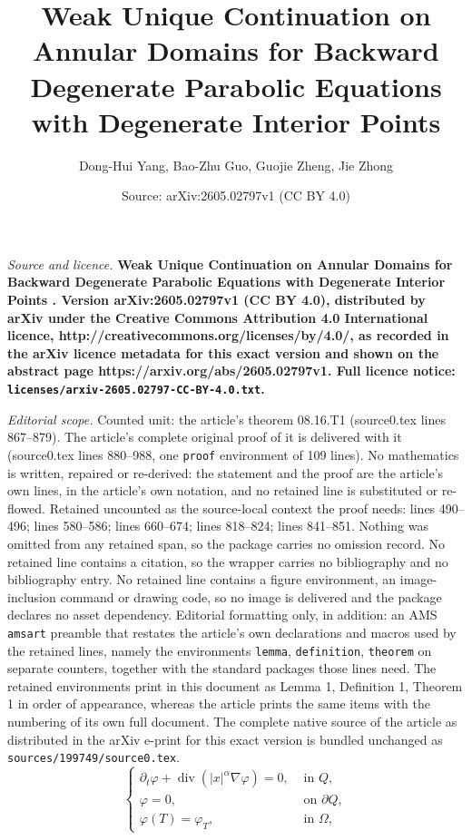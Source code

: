 \documentclass[10pt,a4paper]{amsart}
\title{\bf {\bf Weak Unique Continuation on Annular Domains for Backward Degenerate Parabolic Equations with Degenerate Interior Points }}
\author{Dong-Hui Yang, Bao-Zhu Guo, Guojie Zheng, Jie Zhong}
\date{Source: arXiv:2605.02797v1 (CC BY 4.0)}
\DeclareMathOperator{\Div}{div}
\begin{document}
\maketitle

\noindent\emph{Source and licence.} \bf {\bf Weak Unique Continuation on Annular Domains for Backward Degenerate Parabolic Equations with Degenerate Interior Points }. Version arXiv:2605.02797v1 (CC BY 4.0), distributed by arXiv under the Creative Commons Attribution 4.0 International licence, http://creativecommons.org/licenses/by/4.0/, as recorded in the arXiv licence metadata for this exact version and shown on the abstract page https://arxiv.org/abs/2605.02797v1. Full licence notice: \texttt{licenses/arxiv-2605.02797-CC-BY-4.0.txt}.\par\smallskip

\noindent\textit{Editorial scope.} Counted unit: the article's theorem 08.16.T1 (source0.tex lines 867--879). The article's complete original proof of it is delivered with it (source0.tex lines 880--988, one \texttt{proof} environment of 109 lines). No mathematics is written, repaired or re-derived: the statement and the proof are the article's own lines, in the article's own notation, and no retained line is substituted or re-flowed.  Retained uncounted as the source-local context the proof needs: lines 490--496; lines 580--586; lines 660--674; lines 818--824; lines 841--851.  Nothing was omitted from any retained span, so the package carries no omission record.  No retained line contains a citation, so the wrapper carries no bibliography and no bibliography entry.  No retained line contains a figure environment, an image-inclusion command or drawing code, so no image is delivered and the package declares no asset dependency.  Editorial formatting only, in addition: an AMS \texttt{amsart} preamble that restates the article's own declarations and macros used by the retained lines, namely the environments \texttt{lemma}, \texttt{definition}, \texttt{theorem} on separate counters, together with the standard packages those lines need.  The retained environments print in this document as Lemma 1, Definition 1, Theorem 1 in order of appearance, whereas the article prints the same items with the numbering of its own full document.  The complete native source of the article as distributed in the arXiv e-print for this exact version is bundled unchanged as \texttt{sources/199749/source0.tex}.
\begin{equation}\label{12.14.1}
\begin{cases}
\partial_t \varphi + \Div(|x|^\alpha \nabla \varphi) = 0, & \text{ in } Q, \\
\varphi = 0, & \text{ on } \partial Q, \\
\varphi(T) = \varphi_T, & \text{ in } \Omega,
\end{cases}
\end{equation}
\end{document}
